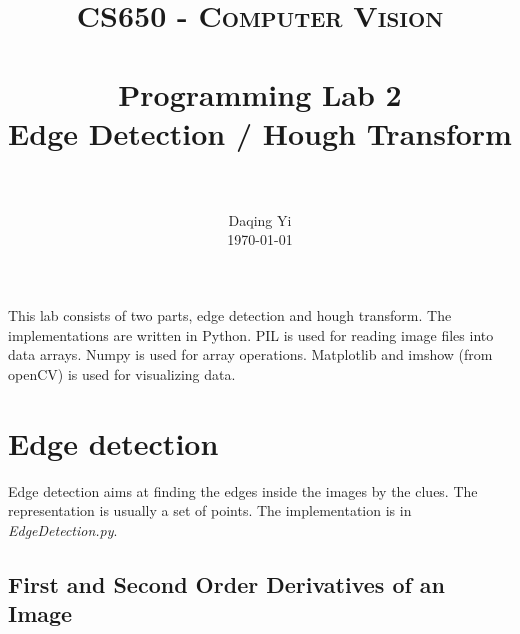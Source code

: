 \documentclass[paper=a4, fontsize=11pt]{scrartcl}
\title{
		\usefont{OT1}{bch}{b}{n}
		\normalfont \normalsize \textsc{CS650 - Computer Vision} \\ [25pt]
		\horrule{0.5pt} \\[0.4cm]
		\huge Programming Lab 2 \\ Edge Detection / Hough Transform \\
		\horrule{2pt} \\[0.5cm]
}
\author{
		\normalfont 								\normalsize
        Daqing Yi\\[-3pt]		\normalsize
        \today
}
\date{}
\numberwithin{equation}{section}		%
\numberwithin{figure}{section}			%
\begin{document}
\maketitle

This lab consists of two parts, edge detection and hough transform.
The implementations are written in Python.
PIL is used for reading image files into data arrays.
Numpy is used for array operations.
Matplotlib and imshow (from openCV) is used for visualizing data.

\section{Edge detection}

Edge detection aims at finding the edges inside the images by the clues.
The representation is usually a set of points.
The implementation is in \emph{EdgeDetection.py}.

\subsection{First and Second Order Derivatives of an Image}
\end{document}
